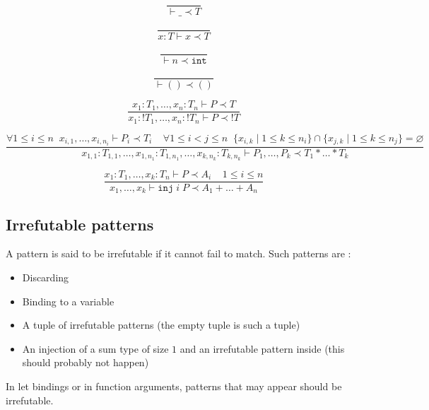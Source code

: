 \documentclass{scrartcl}
\renewcommand{\emptyset}{\varnothing}
\begin{document}
\[
  \frac{}{\vdash \_ \prec T}
\]

\[
  \frac{}{x : T \vdash x \prec T}
\]

\[
  \frac{}{\vdash n \prec \mathtt{int}}
\]

\[
  \frac{}{\vdash () \prec ()}
\]

\[
  \frac{x_1:T_1, \dots, x_n:T_n\vdash P\prec T}
  {x_1: !T_1, \dots, x_n: !T_n\vdash P\prec !T}
\]

\[
  \frac{\forall 1 \leq i \leq n \;\; x_{i, 1}, \dots, x_{i, n_i} \vdash P_i \prec T_i
    \;\;\;\; \forall 1 \leq i < j \leq n
    \;\;\{x_{i, k} \mid 1 \leq k \leq n_i \} \cap \{x_{j, k} \mid 1 \leq k \leq n_j\} = \emptyset}
  {x_{1,1}: T_{1,1}, \dots, x_{1, n_1}: T_{1, n_1}, \dots, x_{k, n_k} : T_{k, n_k} \vdash P_1, \dots, P_k \prec T_1 * \dots * T_k}
\]

\[
  \frac{x_1: T_1, \dots, x_k: T_n \vdash P \prec A_i
    \;\;\;\; 1 \leq i \leq n}
  {x_1, \dots, x_k \vdash \mathtt{inj}\;i\;P \prec A_1 + \dots + A_n}
\]

\subsection{Irrefutable patterns}
A pattern is said to be irrefutable if it cannot fail to match. Such patterns are :
\begin{itemize}
  \item Discarding
  \item Binding to a variable
  \item A tuple of irrefutable patterns (the empty tuple is such a tuple)
  \item An injection of a sum type of size $1$ and an irrefutable pattern inside
        (this should probably not happen)
\end{itemize}

In let bindings or in function arguments, patterns that may appear should be irrefutable.
\end{document}
